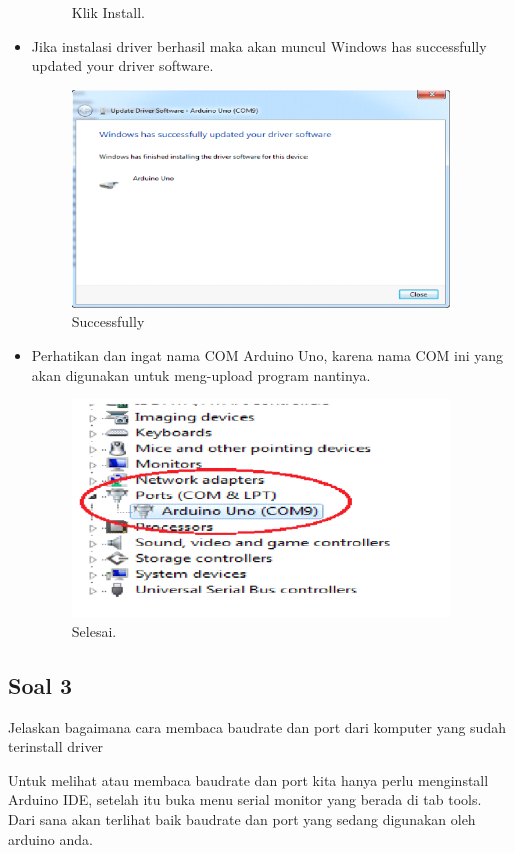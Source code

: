 \begin{itemize}
\begin{figure}[ht]
				\centering
				\caption{Klik Install.}
			\end{figure}
		\item Jika instalasi driver berhasil maka akan muncul Windows has successfully updated your driver software.
			\begin{figure}[ht]
				\includegraphics[width=10cm]{figures/5/1174083/Teori/10.png}
				\centering
				\caption{Successfully}
			\end{figure}
		\item Perhatikan dan ingat nama COM Arduino Uno, karena nama COM ini yang akan digunakan untuk meng-upload program nantinya.
			\begin{figure}[ht]
				\includegraphics[width=10cm]{figures/5/1174083/Teori/11.png}
				\centering
				\caption{Selesai.}
			\end{figure}
	\end{itemize}
	
\subsection{Soal 3}
Jelaskan bagaimana cara membaca baudrate dan port dari komputer yang sudah
terinstall driver

Untuk melihat atau membaca baudrate dan port kita hanya perlu menginstall Arduino IDE, setelah itu buka menu serial monitor yang berada di tab tools. Dari sana akan terlihat baik baudrate dan port yang sedang digunakan oleh arduino anda.

